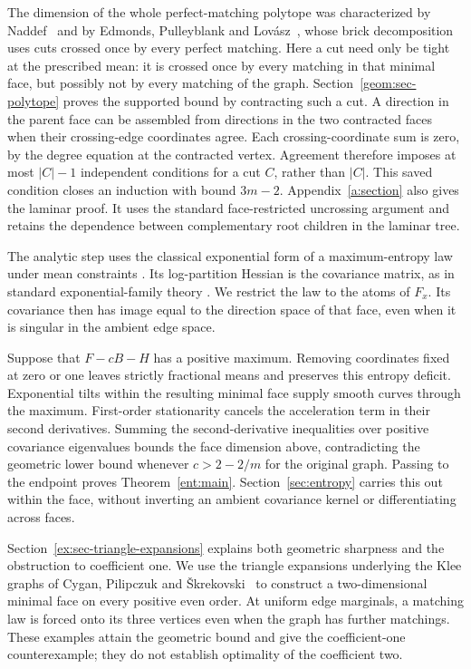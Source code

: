The dimension of the whole perfect-matching polytope was characterized
by Naddef~\citep{Naddef1982} and by Edmonds, Pulleyblank and
Lov\'asz~\citep{EdmondsPulleyblankLovasz1982}, whose brick decomposition
uses cuts crossed once by every perfect matching. Here a cut need only
be tight at the prescribed mean: it is crossed once by every matching
in that minimal face, but possibly not by every matching of the graph.
Section~\ref{geom:sec-polytope} proves the supported bound by contracting
such a cut. A direction in the parent face can be assembled from
directions in the two contracted faces when their crossing-edge
coordinates agree. Each crossing-coordinate sum is zero, by the degree
equation at the contracted vertex. Agreement therefore imposes at most
$|C|-1$ independent conditions for a cut $C$, rather than $|C|$.
This saved condition closes an induction with bound $3m-2$.
Appendix~\ref{a:section} also gives the laminar proof. It uses the standard
face-restricted uncrossing argument
\citep[full version, Lemma~2.2 and Appendix~A]{SvenssonTarnawski2017}
and retains the dependence between complementary root children in the
laminar tree.

The analytic step uses the classical exponential form of a
maximum-entropy law under mean constraints
\citep{Jaynes1957,SinghVishnoi2014}. Its log-partition Hessian is the
covariance matrix, as in standard exponential-family theory
\citep{WainwrightJordan2008}. We restrict the law to the atoms of $F_x$.
Its covariance then has image equal to the direction space of that face,
even when it is singular in the ambient edge space.

Suppose that $F-cB-H$ has a positive maximum. Removing coordinates fixed
at zero or one leaves strictly fractional means and preserves this
entropy deficit. Exponential tilts within the resulting minimal face
supply smooth curves through the maximum. First-order stationarity
cancels the acceleration term in their second derivatives. Summing the
second-derivative inequalities over positive covariance eigenvalues
bounds the face dimension above, contradicting the geometric lower bound
whenever $c>2-2/m$ for the original graph. Passing to the endpoint proves
Theorem~\ref{ent:main}. Section~\ref{sec:entropy} carries this out within
the face, without inverting an ambient covariance kernel or differentiating
across faces.

Section~\ref{ex:sec-triangle-expansions} explains both geometric sharpness
and the obstruction to coefficient one. We use the triangle expansions
underlying the Klee graphs of
Cygan, Pilipczuk and \v{S}krekovski~\citep{CyganPilipczukSkrekovski2013}
to construct a two-dimensional minimal face on every positive even
order. At uniform edge marginals, a matching law is forced onto its
three vertices even when the graph has further matchings. These examples
attain the geometric bound and give the coefficient-one counterexample;
they do not establish optimality of the coefficient two.

